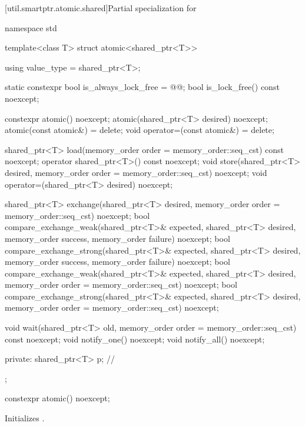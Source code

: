 [util.smartptr.atomic.shared]{Partial specialization for }
%
\begin{codeblock}
namespace std {
  template<class T> struct atomic<shared_ptr<T>> {
    using value_type = shared_ptr<T>;

    static constexpr bool is_always_lock_free = @@;
    bool is_lock_free() const noexcept;

    constexpr atomic() noexcept;
    atomic(shared_ptr<T> desired) noexcept;
    atomic(const atomic&) = delete;
    void operator=(const atomic&) = delete;

    shared_ptr<T> load(memory_order order = memory_order::seq_cst) const noexcept;
    operator shared_ptr<T>() const noexcept;
    void store(shared_ptr<T> desired, memory_order order = memory_order::seq_cst) noexcept;
    void operator=(shared_ptr<T> desired) noexcept;

    shared_ptr<T> exchange(shared_ptr<T> desired,
                           memory_order order = memory_order::seq_cst) noexcept;
    bool compare_exchange_weak(shared_ptr<T>& expected, shared_ptr<T> desired,
                               memory_order success, memory_order failure) noexcept;
    bool compare_exchange_strong(shared_ptr<T>& expected, shared_ptr<T> desired,
                                 memory_order success, memory_order failure) noexcept;
    bool compare_exchange_weak(shared_ptr<T>& expected, shared_ptr<T> desired,
                               memory_order order = memory_order::seq_cst) noexcept;
    bool compare_exchange_strong(shared_ptr<T>& expected, shared_ptr<T> desired,
                                 memory_order order = memory_order::seq_cst) noexcept;

    void wait(shared_ptr<T> old, memory_order order = memory_order::seq_cst) const noexcept;
    void notify_one() noexcept;
    void notify_all() noexcept;

  private:
    shared_ptr<T> p;            // \expos
  };
}
\end{codeblock}

%
\begin{itemdecl}
constexpr atomic() noexcept;
\end{itemdecl}

\begin{itemdescr}
\pnum
\effects
Initializes .
\end{itemdescr}

